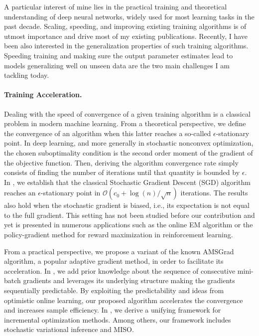 \documentclass[twoside,11pt]{article}
\begin{document}
\vspace{0.2in}
\textbf{}
\vspace{0.2in}

A particular interest of mine lies in the practical training and theoretical understanding of deep neural networks, widely used for most learning tasks in the past decade.
Scaling, speeding, and improving existing training algorithms is of utmost importance and drive most of my existing publications.
Recently, I have been also interested in the generalization properties of such training algorithms. 
Speeding training and making sure the output parameter estimates lead to models generalizing well on unseen data are the two main challenges I am tackling today.

\vspace{0.08in}
\paragraph{Training Acceleration.} 
Dealing with the speed of convergence of a given training algorithm is a classical problem in modern machine learning.
From a theoretical perspective, we define the convergence of an algorithm when this latter reaches a so-called $\epsilon$-stationary point.
In deep learning, and more generally in stochastic nonconvex optimization, the chosen suboptimality condition is the second order moment of the gradient of the objective function. 
Then, deriving the algorithm convergence rate simply consists of finding the number of iterations until that quantity is bounded by $\epsilon$.
In \citep{karimi2019non}, we  establish that the classical Stochastic Gradient Descent (SGD) algorithm reaches an $\epsilon$-stationary point in $\mathcal{O}\left(c_{0}+\log (n) / \sqrt{n}\right)$ iterations. 
The results also hold when the stochastic gradient is biased, i.e., its expectation is not equal to the full gradient. 
This setting has not been studied before our contribution and yet is presented in numerous applications such as the online EM algorithm or the policy-gradient method for reward maximization in reinforcement learning.

From a practical perspective, we propose a variant of the known AMSGrad algorithm, a popular adaptive gradient method, in order to facilitate its acceleration.
In \citep{kun2020}, we add prior knowledge about the sequence of consecutive mini-batch gradients and leverages its underlying structure making the gradients sequentially predictable. 
By exploiting the predictability and ideas from optimistic online learning, our proposed algorithm accelerates the convergence and increases sample efficiency.
In \citep{karimi2019misso}, we derive a unifying framework for incremental optimization methods. 
Among others, our framework includes stochastic variational inference and MISO.
\end{document}
